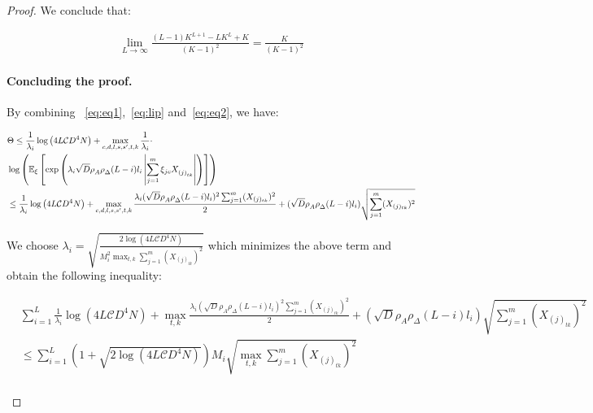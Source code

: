 \begin{proof}
We conclude that:
\begin{small}
\begin{equation*}
\begin{aligned}
\lim_{L \rightarrow \infty} \frac{(L-1)K^{L+1} - L K^L +K}{(K-1)^2}= \frac{K}{(K-1)^2}
\end{aligned}
\end{equation*}
\end{small}

\paragraph{Concluding the proof.} By combining ~\eqref{eq:eq1},~\eqref{eq:lip} and~\eqref{eq:eq2}, we have:
\begin{small}
\begin{equation*}
\begin{aligned}
& { \Theta} \leq  \frac{1}{\lambda_i} \log \left(4 L \mathcal{C} D^4 N \right) + \max_{c, d, l, s, s', t, k} \frac{1}{\lambda_i} \cdot \\& \log \left(  \mathbb{E}_{\xi}\left[ \exp \left(\lambda_i \sqrt{D} \rho^{}_A \rho^{}_{\Delta} (L-i) l_i  \left|  \sum_{j=1}^m \xi_{jc} 
X^{}_{{(j)}_{tk}}  \right| \right)\right] \right) \\
&\leq \frac{1}{\lambda_i}  \log \left(4L \mathcal{C} D^4 N \right) +  \max_{c, d, l, s, s', t, k} \frac{\lambda_i (\sqrt{D} \rho^{}_A \rho^{}_{\Delta} (L-i) l_i)^2 \sum_{j=1}^m (X_{(j)_{tk}})^2}{2} + (\sqrt{D} \rho^{}_A \rho^{}_{\Delta} (L-i) l_i)\sqrt{\sum_{j=1}^m (X_{(j)_{tk}})^2} \\
\end{aligned}
\end{equation*}
\end{small}
We choose $\lambda_i = \sqrt{\frac{2\log (4 L \mathcal{C} D^4 N)}{M_i^2  \max_{t,k}\sum_{j=1}^m (X_{(j)_{tk}})^2}}$ which minimizes the above term and obtain the following inequality:
\begin{small}
\begin{equation*}
\begin{aligned}
&\sum_{i=1}^L \frac{1}{\lambda_i} \log \left(4L \mathcal{C} D^4 N \right) + \max_{t, k} \frac{\lambda_i (\sqrt{D} \rho^{}_A \rho^{}_{\Delta} (L-i) l_i)^2 \sum_{j=1}^m (X_{(j)_{tk}})^2}{2} + (\sqrt{D} \rho^{}_A \rho^{}_{\Delta} (L-i) l_i)\sqrt{\sum_{j=1}^m (X_{(j)_{tk}})^2}\\
&\leq \sum_{i=1}^L (1 + \sqrt{2\log (4L \mathcal{C} D^4 N)})M_i\sqrt{ \max_{t, k}\sum_{j=1}^m (X_{(j)_{tk}})^2}\\

\end{aligned}
\end{equation*}
\end{small}
\end{proof}
